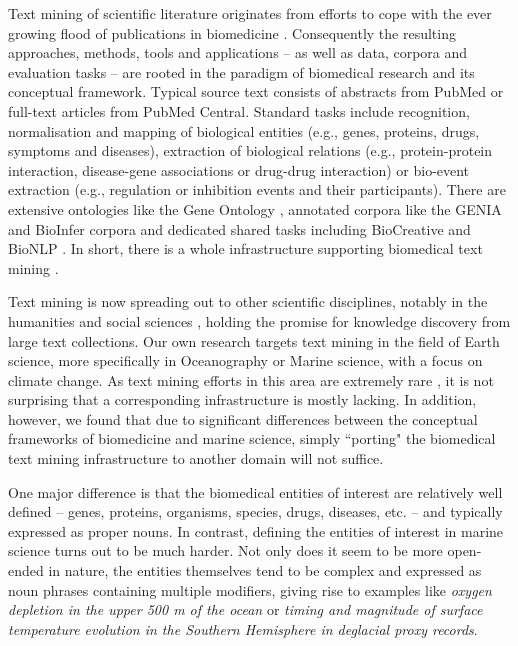 \documentclass[11pt]{article}
\begin{document}
Text mining of scientific literature originates from efforts to cope with the ever growing flood of publications in biomedicine \cite{Swanson1986Fish,Swa88,Swanson1997Interactive,Hearst:1999aa,Ananiadou2006,Zweigenbaum2007Frontiers,Cohen2005Survey,Krallinger2008Linking,RodriguezEsteban2009Biomedical,Zweigenbaum2009Advanced,Ananiadou2010Event,Simpson2012Biomedical,ananiadou2014event}.
Consequently the resulting approaches, methods, tools and applications -- as well as data, corpora and evaluation tasks -- are rooted in the paradigm of biomedical research and its conceptual framework.
Typical source text consists of abstracts from PubMed or full-text articles from PubMed Central.
Standard tasks include recognition, normalisation and mapping of biological entities (e.g., genes, proteins, drugs, symptoms and diseases), extraction of biological relations (e.g., protein-protein interaction, disease-gene associations or drug-drug interaction) or bio-event extraction (e.g., regulation or inhibition events and their participants). 
There are extensive ontologies like the Gene Ontology \cite{ConsortiumTheGeneOntology2001Creating}, annotated corpora like the GENIA \cite{Kim2003GENIA} and BioInfer \cite{Pyysalo:2007} corpora and  dedicated shared tasks including BioCreative \cite{Hirschman2005Overview} and BioNLP \cite{Pyysalo2012Overview}.
In short, there is a whole infrastructure supporting biomedical text mining \cite{Cohen2008Getting}.

Text mining is now spreading out to other scientific disciplines, notably in the humanities and social sciences \cite{oconnor2011}, holding the promise for knowledge discovery from large text collections.
Our own research targets text mining in the field of Earth science, more specifically in Oceanography or Marine science, with a focus on climate change.
As text mining efforts in this area are extremely rare \cite{ekstrom2008exploratory,vossen-EtAl:2010:ONTOLEX,Zhang2013GeoDeepDive,marsi2014towards,aamot2014literature}, it is not surprising that a corresponding infrastructure is mostly lacking.
In addition, however, we found that due to significant differences between the conceptual frameworks of biomedicine and marine science, simply ``porting" the biomedical text mining infrastructure to another domain will not suffice.

One major difference is that the biomedical entities of interest are relatively well defined -- genes, proteins, organisms, species, drugs, diseases, etc. -- and typically expressed as proper nouns.
In contrast, defining the entities of interest in marine science turns out to be much harder.
Not only does it seem to be more open-ended in nature, the entities themselves tend to be complex and expressed as noun phrases containing multiple modifiers, giving rise to examples like \emph{oxygen depletion in the upper 500 m of the ocean} or \emph{timing and magnitude of surface temperature evolution in the Southern Hemisphere in deglacial proxy records}.
\end{document}
